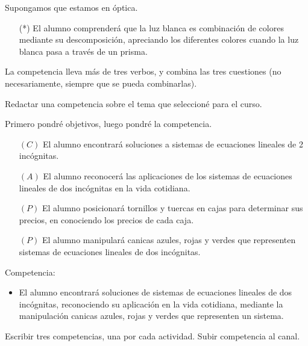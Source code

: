 \documentclass[12pt]{report}
\newcounter{it}
\theoremstyle{largebreak}
\begin{document}
    Supongamos que estamos en óptica.

    \begin{itemize}
        \item[(*)] El alumno comprenderá que la luz blanca es combinación de colores mediante su descomposición, apreciando los diferentes colores cuando la luz blanca pasa a través de un prisma.
    \end{itemize}

    La competencia lleva más de tres verbos, y combina las tres cuestiones (no necesariamente, siempre que se pueda combinarlas).

    \begin{excer}
        Redactar una competencia sobre el tema que seleccioné para el curso.
    \end{excer}

    Primero pondré objetivos, luego pondré la competencia.

    \begin{itemize}
        \item[$(C)$] El alumno encontrará soluciones a sistemas de ecuaciones lineales de 2 incógnitas.
        \item[$(A)$] El alumno reconocerá las aplicaciones de los sistemas de ecuaciones lineales de dos incógnitas en la vida cotidiana.
        \item[$(P)$] El alumno posicionará tornillos y tuercas en cajas para determinar sus precios, en conociendo los precios de cada caja.
        \item[$(P)$] El alumno manipulará canicas azules, rojas y verdes que representen sistemas de ecuaciones lineales de dos incógnitas.
    \end{itemize}

    Competencia:

    \begin{itemize}
        \item El alumno encontrará soluciones de sistemas de ecuaciones lineales de dos incógnitas, reconociendo su aplicación en la vida cotidiana, mediante la manipulación canicas azules, rojas y verdes que representen un sistema.
    \end{itemize}

    \begin{excer}
        Escribir tres competencias, una por cada actividad. Subir competencia al canal.
    \end{excer}
\end{document}
